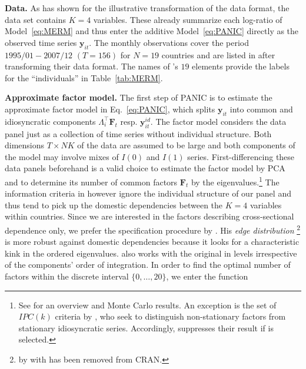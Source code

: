 \textbf{Data.} As  has shown for the illustrative transformation of the data format, the data set  contains $ K=4 $ variables. These already summarize each log-ratio of Model~\eqref{eq:MERM} and thus enter the additive Model~\eqref{eq:PANIC} directly as the observed time series $ \boldsymbol{y}_{it} $. The  monthly observations cover the period $ 1995/01 - 2007/12 $ $ (T = 156) $ for $ N = 19 $ countries and are listed in  after transforming their data format. The names of 's $ 19 $ elements provide the labels for the ``individuals'' in Table~\ref{tab:MERM}.


\textbf{Approximate factor model.} The first step of PANIC is to estimate the approximate factor model in Eq.~\eqref{eq:PANIC}, which splits $ \boldsymbol{y}_{it} $ into common and idiosyncratic components $ \Lambda_i^\top \boldsymbol{F}_t $ resp. $ \boldsymbol{y}^{i \! d}_{it} $. The factor model considers the data panel just as a collection of time series without individual structure. Both dimensions $ T \times NK $ of the data are assumed to be large and both components of the model may involve mixes of $  I(0) $ and $ I(1) $ series. First-differencing these data panels beforehand is a valid choice to estimate the factor model by PCA \citep{BaiNg2004} and to determine its number of common factors $ \boldsymbol{F}_t $ by the eigenvalues.\footnote{See \cite{CoronaEtAl2017} for an overview and Monte Carlo results. An exception is the set of $ IPC(k) $ criteria by \citet{Bai2004}, who seek to distinguish non-stationary factors from stationary idiosyncratic series. Accordingly,  suppresses their result if  is selected.} The information criteria in \code{[[1]]} however ignore the individual structure of our panel and thus tend to pick up the domestic dependencies between the $ K=4 $ variables within countries. Since we are interested in the factors describing cross-sectional dependence only, we prefer the specification procedure by \cite{Onatski2010}. His \textit{edge distribution} \footnote{ by \citet{BadaLiebl2014} with  has been removed from CRAN.} is more robust against domestic dependencies because it looks for a characteristic kink in the ordered eigenvalues.  also works with the original  in levels irrespective of the components' order of integration. In order to find the optimal number of factors within the discrete interval $ \lbrace 0,\ldots,20 \rbrace $, we enter the  function 
